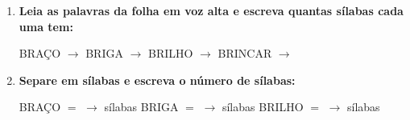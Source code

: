 \begin{exercicio}
\begin{enumerate}[resume]
  \item \textbf{Leia as palavras da folha em voz alta e escreva quantas sílabas cada uma tem:}

  \begin{center}
  BRAÇO $\rightarrow$ \underline{\hspace{1cm}} \quad BRIGA $\rightarrow$ \underline{\hspace{1cm}} \quad BRILHO $\rightarrow$ \underline{\hspace{1cm}} \quad BRINCAR $\rightarrow$ \underline{\hspace{1cm}}
  \end{center}

  \item \textbf{Separe em sílabas e escreva o número de sílabas:}
  \begin{center}
  BRAÇO $=$ \underline{\hspace{1.2cm}} $\rightarrow$ \underline{\hspace{0.8cm}} sílabas \quad BRIGA $=$ \underline{\hspace{1.2cm}} $\rightarrow$ \underline{\hspace{0.8cm}} sílabas \quad BRILHO $=$ \underline{\hspace{1.2cm}} $\rightarrow$ \underline{\hspace{0.8cm}} sílabas
  \end{center}

\end{enumerate}

\end{exercicio}



